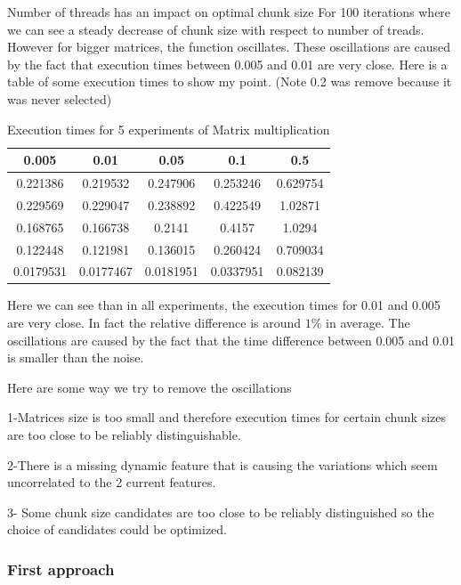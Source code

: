 \documentclass[12pt]{article}
\begin{document}
Number of threads has an impact on optimal chunk size For 100 iterations where we can see a steady decrease of chunk size with respect to number of treads. However for bigger matrices, the function oscillates. These oscillations are caused by the fact that execution times between 0.005 and 0.01 are very close. Here is a table of some execution times to show my point. (Note 0.2 was remove because it was never selected)

\begin{table}[h]
	\centering
	\caption{Execution times for 5 experiments of Matrix multiplication}
	\label{my-label}
	\begin{tabular}{|c|c|c|c|c|}
		\hline
		0.005& 0.01           & 0.05 & 0.1 & 0.5 \\ \hline
		0.221386 & 0.219532  & 0.247906    & 0.253246        & 0.629754 \\ \hline
		0.229569 & 0.229047 & 0.238892   & 0.422549        & 1.02871  \\ \hline
		0.168765 & 0.166738  & 0.2141   & 0.4157       & 1.0294  \\ \hline
		0.122448 & 0.121981  & 0.136015    & 0.260424        & 0.709034 \\ \hline
		0.0179531 & 0.0177467 & 0.0181951  & 0.0337951        & 0.082139 \\ \hline
	\end{tabular}
\end{table}

Here we can see than in all experiments, the execution times for 0.01 and 0.005 are very close. In fact the relative difference is around $1\%$ in average. The oscillations are caused by the fact that the time difference between 0.005 and 0.01 is smaller than the noise.

Here are some way we try to remove the oscillations

1-Matrices size is too small and therefore execution times for certain chunk sizes are too close to be reliably distinguishable.

2-There is a missing dynamic feature that is causing the variations which seem uncorrelated to the 2 current features.

3- Some chunk size candidates are too close to be reliably distinguished so the choice of candidates could be optimized.
\
\subsubsection{First approach}
\end{document}
